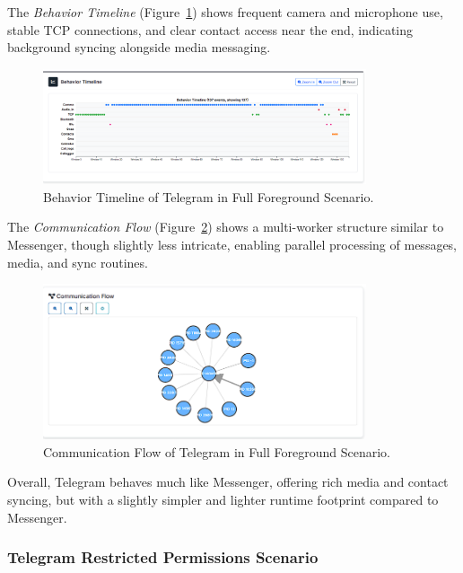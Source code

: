 \documentclass[a4paper,12pt]{report}
\begin{document}
The \textit{Behavior Timeline} (Figure~\ref{fig:telegram-full-behav}) shows frequent camera and microphone use, stable TCP connections, and clear contact access near the end, indicating background syncing alongside media messaging.

\begin{figure}[H]
    \centering
    \includegraphics[width=0.85\textwidth]{telegram-full-behav.png}
    \caption{Behavior Timeline of Telegram in Full Foreground Scenario.}
    \label{fig:telegram-full-behav}
\end{figure}

The \textit{Communication Flow} (Figure~\ref{fig:telegram-full-flow}) shows a multi-worker structure similar to Messenger, though slightly less intricate, enabling parallel processing of messages, media, and sync routines.

\begin{figure}[H]
    \centering
    \includegraphics[width=0.85\textwidth]{telegram-full-flow.png}
    \caption{Communication Flow of Telegram in Full Foreground Scenario.}
    \label{fig:telegram-full-flow}
\end{figure}

Overall, Telegram behaves much like Messenger, offering rich media and contact syncing, but with a slightly simpler and lighter runtime footprint compared to Messenger.

\subsubsection{Telegram Restricted Permissions Scenario}
\end{document}
